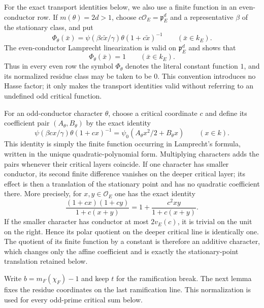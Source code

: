 \documentclass[11pt]{amsart}
\theoremstyle{definition}
\theoremstyle{remark}
\newcommand{\cO}{\mathcal O}
\newcommand{\p}{\mathfrak p}
\begin{document}
For the exact transport identities below, we also use a finite function
in an even-conductor row.  If $m(\theta)=2d>1$, choose
$c\cO_E=\p_E^d$ and a representative $\beta$ of the stationary class,
and put
\begin{equation}\label{eq:even-critical-function-constant}
 \Phi_\theta(\bar x)=
 \psi(\beta c\widetilde x/\gamma)
 \theta(1+c\widetilde x)^{-1}\qquad(\bar x\in k_E).
\end{equation}
The even-conductor Lamprecht linearization is valid on $\p_E^d$ and
shows that
\[
 \Phi_\theta(\bar x)=1\qquad(\bar x\in k_E).
\]
Thus in every even row the symbol $\Phi_\theta$ denotes the literal
constant function $1$, and its normalized residue class may be taken
to be $0$.  This convention introduces no Hasse factor; it only makes
the transport identities valid without referring to an undefined odd
critical function.

For an odd-conductor character $\theta$, choose a critical coordinate
$c$ and define its coefficient pair $(A_\theta,B_\theta)$ by the exact
identity
\begin{equation}\label{eq:critical-pair-definition}
 \psi(\beta cx/\gamma)\theta(1+cx)^{-1}
 =\psi_0(A_\theta x^2/2+B_\theta x)
 \qquad(x\in k).
\end{equation}
This identity is simply the finite function occurring in Lamprecht's
formula, written in the unique quadratic-polynomial form.  Multiplying
characters adds the pairs whenever their critical layers coincide.  If
one character has smaller conductor, its second finite difference
vanishes on the deeper critical layer; its effect is then a translation
of the stationary point and has no quadratic coefficient there.  More
precisely, for $x,y\in\cO_E$ one has the exact identity
\[
 \frac{(1+cx)(1+cy)}{1+c(x+y)}
 =1+\frac{c^2xy}{1+c(x+y)}.
\]
If the smaller character has conductor at most $2v_E(c)$, it is trivial
on the unit on the right.  Hence its polar quotient on the deeper
critical line is identically one.  The quotient of its finite function
by a constant is therefore an additive character, which changes only
the affine coefficient and is exactly the stationary-point
translation retained below.

Write $b=m_F(\chi_F)-1$ and keep $t$ for the ramification break.
The next lemma fixes the residue coordinates on the last ramification
line.  This normalization is used for every odd-prime critical sum
below.
\end{document}
